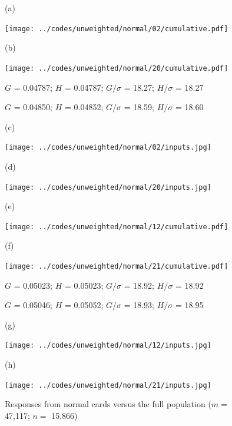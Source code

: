 \documentclass{article}
\newlength{\vertsep}
\newlength{\imsize}
\newlength{\imsized}
\begin{document}
\begin{figure}
\begin{centering}

(a) \parbox{\imsize}{\texttt{[image: ../codes/unweighted/normal/02/cumulative.pdf]}}
\quad\quad
(b) \parbox{\imsize}{\texttt{[image: ../codes/unweighted/normal/20/cumulative.pdf]}}

\parbox{\imsized}{\hfil \footnotesize $G$ = 0.04787; $H$ = 0.04787;
$G/\sigma$ = 18.27; $H/\sigma$ = 18.27}
\parbox{\imsized}{\hfil \footnotesize $G$ = 0.04850; $H$ = 0.04852;
$G/\sigma$ = 18.59; $H/\sigma$ = 18.60}

\vspace{\vertsep}

(c) \parbox{\imsize}{\texttt{[image: ../codes/unweighted/normal/02/inputs.jpg]}}
\quad\quad
(d) \parbox{\imsize}{\texttt{[image: ../codes/unweighted/normal/20/inputs.jpg]}}

\vspace{\vertsep}

(e) \parbox{\imsize}{\texttt{[image: ../codes/unweighted/normal/12/cumulative.pdf]}}
\quad\quad
(f) \parbox{\imsize}{\texttt{[image: ../codes/unweighted/normal/21/cumulative.pdf]}}

\parbox{\imsized}{\hfil \footnotesize $G$ = 0.05023; $H$ = 0.05023;
$G/\sigma$ = 18.92; $H/\sigma$ = 18.92}
\parbox{\imsized}{\hfil \footnotesize $G$ = 0.05046; $H$ = 0.05052;
$G/\sigma$ = 18.93; $H/\sigma$ = 18.95}

\vspace{\vertsep}

(g) \parbox{\imsize}{\texttt{[image: ../codes/unweighted/normal/12/inputs.jpg]}}
\quad\quad
(h) \parbox{\imsize}{\texttt{[image: ../codes/unweighted/normal/21/inputs.jpg]}}

\end{centering}
\caption{Responses from normal cards versus the full population
($m =$ 47,117; $n =$ 15,866)}
\label{normal}
\end{figure}
\end{document}
